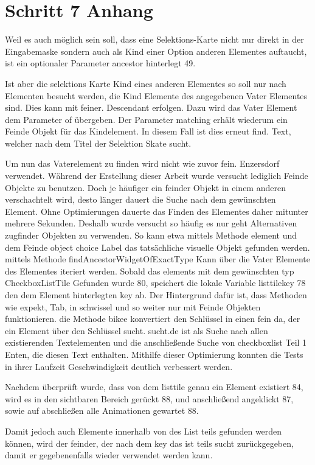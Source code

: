 \chapter{Schritt 7 Anhang} 
\label{appendix:Schritt7Anhang}


Weil es auch möglich sein soll, dass eine Selektions-Karte nicht nur direkt in der Eingabemaske sondern  auch als Kind einer Option anderen Elementes auftaucht, ist ein optionaler Parameter ancestor hinterlegt 49.

Ist aber die selektions Karte Kind eines anderen Elementes  so soll nur nach Elementen besucht werden, die Kind Elemente des angegebenen Vater Elementes sind. Dies kann mit feiner. Descendant erfolgen. Dazu wird das Vater Element dem Parameter of übergeben. Der Parameter matching erhält wiederum ein Feinde Objekt für das Kindelement. In diesem Fall ist dies erneut find. Text, welcher nach dem Titel der Selektion Skate sucht.


Um nun das Vaterelement zu finden wird nicht wie zuvor fein. Enzersdorf verwendet.
Während der Erstellung dieser Arbeit wurde versucht lediglich Feinde Objekte zu benutzen. Doch je häufiger ein feinder Objekt in einem anderen verschachtelt wird, desto länger dauert die Suche nach dem gewünschten Element. Ohne Optimierungen dauerte das Finden des Elementes  daher mitunter mehrere Sekunden. Deshalb wurde versucht so häufig es nur geht Alternativen  zugfinder  Objekten zu verwenden. So kann etwa mittels Methode element  und dem Feinde object choice Label das tatsächliche   visuelle Objekt gefunden werden.  mittels Methode findAncestorWidgetOfExactType Kann über die Vater Elemente des Elementes iteriert werden. Sobald das elements mit dem gewünschten typ CheckboxListTile Gefunden wurde  80,  speichert die lokale Variable listtilekey 78  den dem Element hinterlegten key ab.  Der Hintergrund dafür ist, dass Methoden wie expekt, Tab, in schwissel und so weiter nur mit Feinde Objekten funktionieren.   die Methode bikee   konvertiert den Schlüssel in einen fein da, der ein Element über den Schlüssel sucht.  sucht.de ist als Suche nach allen existierenden Textelementen und die anschließende Suche von checkboxlist Teil 1 Enten, die diesen Text enthalten. Mithilfe dieser Optimierung konnten die Tests in ihrer Laufzeit Geschwindigkeit deutlich verbessert werden.

Nachdem überprüft wurde, dass von dem listtile genau ein Element existiert 84, wird es in den sichtbaren Bereich gerückt 88, und anschließend  angeklickt 87, sowie auf abschließen alle Animationen gewartet 88.


Damit jedoch auch Elemente innerhalb von des List teils gefunden werden können,  wird der feinder, der nach dem key das ist teils sucht zurückgegeben, damit er gegebenenfalls wieder verwendet werden kann.
